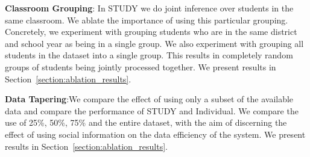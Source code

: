 \documentclass{article}
\begin{document}
\textbf{Classroom Grouping}: In STUDY we do joint inference over students in the same classroom. We ablate the importance of using this particular grouping. Concretely, we experiment with grouping students who are in the same district and school year as being in a single group. We also experiment with grouping all students in the dataset into a single group. This results in completely random groups of students being jointly processed together. We present results in Section~\ref{section:ablation_results}.

\textbf{Data Tapering}:We compare the effect of using only a subset of the available data and compare the performance of STUDY and Individual. We compare the use of 25\%, 50\%, 75\% and the entire dataset, with the aim of discerning the effect of using social information on the data efficiency of the system.  We present results in Section~\ref{section:ablation_results}.
\end{document}
